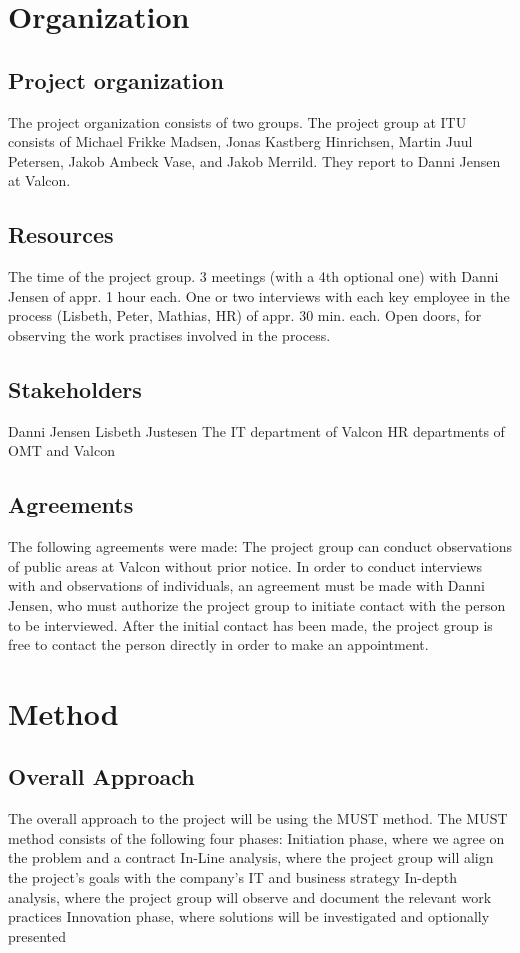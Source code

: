 \section{Organization}
\subsection{Project organization}
The project organization consists of two groups. The project group at ITU consists of Michael Frikke Madsen, Jonas Kastberg Hinrichsen, Martin Juul Petersen, Jakob Ambeck Vase, and Jakob Merrild. They report to Danni Jensen at Valcon.

\subsection{Resources}
The time of the project group.
3 meetings (with a 4th optional one) with Danni Jensen of appr. 1 hour each.
One or two interviews with each key employee in the process (Lisbeth, Peter, Mathias, HR) of appr. 30 min. each.
Open doors, for observing the work practises involved in the process.

\subsection{Stakeholders}
Danni Jensen
Lisbeth Justesen
The IT department of Valcon
HR departments of OMT and Valcon

\subsection{Agreements}
The following agreements were made:
The project group can conduct observations of public areas at Valcon without prior notice.
In order to conduct interviews with and observations of individuals, an agreement must be made with Danni Jensen, who must authorize the project group to initiate contact with the person to be interviewed. 
After the initial contact has been made, the project group is free to contact the person directly in order to make an appointment.

\section{Method}
\subsection{Overall Approach}
The overall approach to the project will be using the MUST method. The MUST method consists of the following four phases:
Initiation phase, where we agree on the problem and a contract
In-Line analysis, where the project group will align the project’s goals with the company’s IT and business strategy
In-depth analysis, where the project group will observe and document the relevant work practices
Innovation phase, where solutions will be investigated and optionally presented

